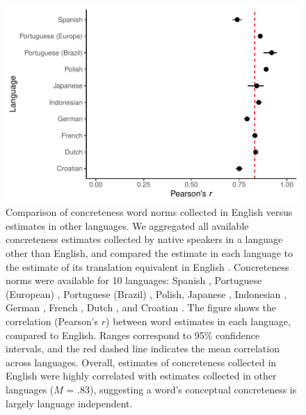 \documentclass[9pt,twoside,lineno]{pnas-new}
\begin{document}
 \begin{figure}[h]
\centering
     \includegraphics[width = 5in]{suppfigs/conc_corrs.pdf}
         \caption{Comparison of concreteness word norms collected in English versus estimates in other languages. We  aggregated all available concreteness estimates collected by native speakers in a language other than English, and compared the estimate in each language to the estimate of its translation equivalent in English \cite{brysbaert2014concreteness}. Concreteness norms were available for 10 languages: Spanish \cite{guasch2016spanish}, Portuguese (European) \cite{soares2017minho}, Portuguese (Brazil) \cite{lima2021norms}, Polish, \cite{imbir2016affective} Japanese \cite{allen2014cross}, Indonesian \cite{sianipar2016affective}, German \cite{charbonnier2020predicting}, French \cite{bonin2018concreteness}, Dutch \cite{brysbaert2014norms}, and Croatian \cite{coso2019affective}. The figure shows the correlation (Pearson's $r$) between word estimates in each language, compared to English. Ranges correspond to 95\% confidence intervals, and the red dashed line indicates the  mean correlation across languages. Overall, estimates of concreteness collected in English were highly correlated with estimates collected in other languages ($M$ = .83), suggesting a word's conceptual concreteness is largely language independent. }
\end{figure}

\pagebreak
\clearpage
\end{document}
